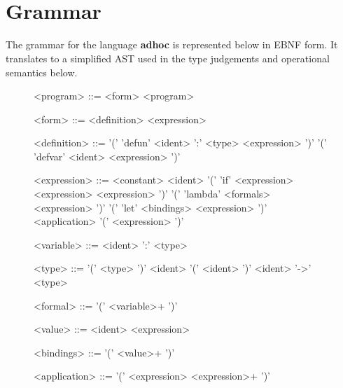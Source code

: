\documentclass[10pt,a4paper,fleqn]{article}
\begin{document}
\begin{figure}[H]
    \begin{bnf*}
                { \bnfor \bnfes} \\
                { \bnfor {}
                 \bnfsp \bnfts{;} \bnfsp {}} \\
                {}
    \end{bnf*}
\end{figure}


\section{Grammar}

The grammar for the language \textbf{adhoc} is represented below in
EBNF form. It translates to a simplified AST used in the type judgements
and operational semantics below.


\begin{figure}[H]
\setlength{\grammarindent}{8em}
\renewcommand{\grammarlabel}[2]{\synt{#1}\hfill#2}
\begin{grammar}
<program> ::= <form> <program>

<form> ::= <definition>
    \alt <expression>

<definition> ::= '(' 'defun' <ident> ':' <type> <expression> ')'
    \alt '(' 'defvar' <ident> <expression> ')'

<expression> ::= <constant>
    \alt <ident>
    \alt '(' 'if' <expression> <expression> <expression> ')'
    \alt '(' 'lambda' <formals> <expression> ')'
    \alt '(' 'let' <bindings> <expression> ')'
    \alt <application>
    \alt '(' <expression> ')'

<variable> ::= <ident> ':' <type>

<type> ::= '(' <type> ')'
    \alt <ident>
    \alt '(' <ident> ')'
    \alt <ident> '->' <type>

<formal> ::= '(' <variable>+ ')'

<value> ::= <ident> <expression>

<bindings> ::= '(' <value>+ ')'

<application> ::= '(' <expression> <expression>+ ')'
\end{grammar}
\end{figure}
\end{document}
